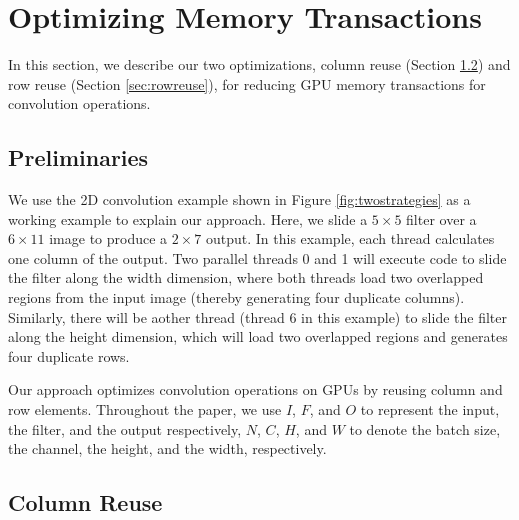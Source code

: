 \section{Optimizing Memory Transactions}
\label{sec:strategies} In this section, we describe our two optimizations, column reuse (Section \ref{sec:creuse}) and row reuse (Section
\ref{sec:rowreuse}), for reducing GPU memory transactions for convolution operations.

\subsection{Preliminaries}
 We use the 2D convolution example shown in Figure \ref{fig:twostrategies} as a working example to explain our
approach. Here, we slide a $5 \times 5$ filter over a $6 \times 11$ image to produce a $2 \times 7$ output. In this example, each thread
calculates one column of the output. Two parallel threads 0 and 1 will execute code to slide the filter along the width dimension, where
both threads load two overlapped regions from the input image (thereby generating four duplicate columns). Similarly, there will be aother
thread (thread 6 in this example) to slide the filter along the height dimension, which will load two overlapped regions and generates four
duplicate rows.


 Our approach optimizes convolution operations on GPUs by reusing column and row elements. Throughout the paper, we use
$I$, $F$, and $O$ to represent the input, the filter, and the output respectively, $N$, $C$, $H$, and $W$ to denote the batch size, the
channel, the height, and the width, respectively.


\subsection{Column Reuse}
\label{sec:creuse}

